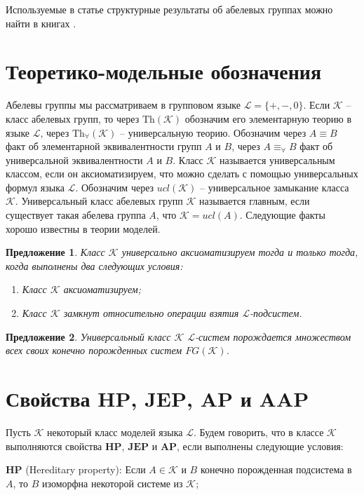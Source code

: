\documentclass[12pt]{extarticle} %
\newtheorem{proposition}{Предложение}[section]
\def\K{{\mathcal{K}}}
\def\L{{\mathcal{L}}}
\def\Th{{\mathrm{Th}}}
\def\Tha{{\mathrm{Th}_\forall}}
\def\HP{\textbf{HP}}
\def\JEP{\textbf{JEP}}
\def\AP{\textbf{AP}}
\def\AAP{\textbf{AAP}}
\begin{document}
Используемые в статье структурные результаты об абелевых группах можно найти в книгах \cite{Fuchs1, Fuchs2, Ershov}.

\section{Теоретико-модельные обозначения} 
Абелевы группы мы рассматриваем в групповом языке $\L = \{+, -, 0\}$. Если $\K$ -- класс абелевых групп, то через $\Th(\K)$ обозначим его элементарную теорию в языке $\L$, через $\Tha(\K)$ -- универсальную теорию. Обозначим через $A \equiv B$ факт об элементарной эквивалентности групп $A$ и $B$, через $A \equiv_{\forall} B$ факт об универсальной эквивалентности $A$ и $B$. Класс $\K$ называется универсальным классом, если он аксиоматизируем, что можно сделать с помощью универсальных формул языка $\L$. Обозначим через $ucl(\K)$ -- универсальное замыкание класса $\K$. Универсальный класс абелевых групп $\K$ называется главным, если существует такая абелева группа $A$, что $\K = ucl(A)$. Следующие факты хорошо известны в теории моделей.

\begin{proposition}\label{prop:AxiomClass2}
Класс $\K$ универсально аксиоматизируем тогда и только тогда, когда выполнены два следующих условия:
\begin{enumerate}
\item Класс $\K$ аксиоматизируем;
\item Класс $\K$ замкнут относительно операции взятия $\L$-подсистем.
\end{enumerate}
\end{proposition}

\begin{proposition}\label{prop:ClassGeneratesFinetObjects}
Универсальный класс $\K$ $\L$-систем порождается множеством всех своих конечно порожденных систем $FG(\K)$.
\end{proposition}


\section{Свойства $\HP$, $\JEP$, $\AP$ и $\AAP$} 
Пусть $\K$ некоторый класс моделей языка $\L$. Будем говорить, что в классе $\K$ выполняются свойства $\HP$, $\JEP$ и $\AP$, если выполнены следующие условия:

\noindent $\HP$ (Hereditary property): Если $A \in \K$ и $B$ конечно порожденная подсистема в $A$, то $B$ изоморфна некоторой системе из $\K$; 
\end{document}
